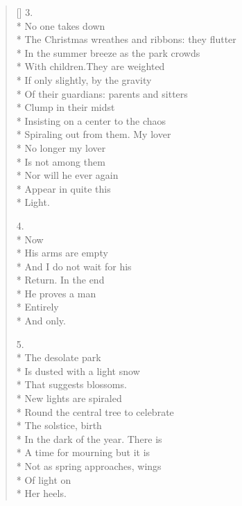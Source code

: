 \begin{verse}[\versewidth]
3.\\*
No one takes down \\*
The Christmas wreathes and ribbons: they flutter\\*
In the summer breeze as the park crowds \\*
With children.\qquad They are weighted\\*
If only slightly, by the gravity\\*
Of their guardians: parents and sitters\\*
Clump in their midst\\*
Insisting on a center to the chaos\\*
Spiraling out from them. My lover\\*
No longer my lover\\*
Is not among them\\*
Nor will he ever again\\*
Appear in quite this \\*
Light.

4.\\*
Now\\*
His arms are empty\\*
And I do not wait for his\\*
Return.  In the end\\*
He proves a man\\*
Entirely\\*
And only.

5.\\*
The desolate park\\*
Is dusted with a light snow\\*
That suggests blossoms.\\*
New lights are spiraled\\*
Round the central tree to celebrate\\*
The solstice, birth\\*
In the dark of the year.  There is\\*
A time for mourning but it is\\*
Not as spring approaches, wings\\*
Of light on\\*
Her heels.
\end{verse}
